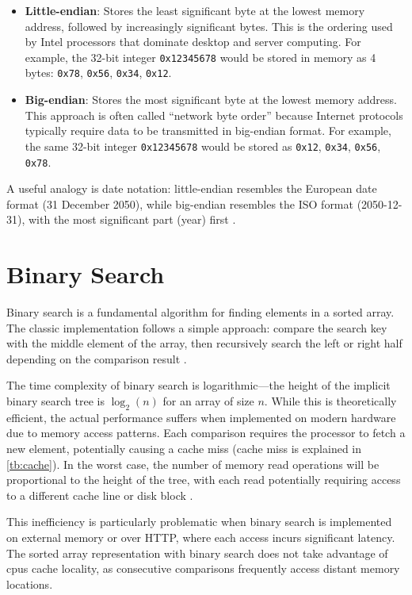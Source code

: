 \begin{itemize}
  \item \textbf{Little-endian}: Stores the least significant byte at the lowest memory address, followed by increasingly significant bytes. This is the ordering used by Intel processors that dominate desktop and server computing. For example, the 32-bit integer \texttt{0x12345678} would be stored in memory as 4 bytes: \texttt{0x78}, \texttt{0x56}, \texttt{0x34}, \texttt{0x12}.

  \item \textbf{Big-endian}: Stores the most significant byte at the lowest memory address. This approach is often called ``network byte order'' because Internet protocols typically require data to be transmitted in big-endian format. For example, the same 32-bit integer \texttt{0x12345678} would be stored as \texttt{0x12}, \texttt{0x34}, \texttt{0x56}, \texttt{0x78}.
\end{itemize}

A useful analogy is date notation: little-endian resembles the European date format (31 December 2050), while big-endian resembles the ISO format (2050-12-31), with the most significant part (year) first \citep{endianness_mdn}.

\section{Binary Search}
\label{tb:binary_search}

Binary search is a fundamental algorithm for finding elements in a sorted array. The classic implementation follows a simple approach: compare the search key with the middle element of the array, then recursively search the left or right half depending on the comparison result \citep{binary_search}.

The time complexity of binary search is logarithmic—the height of the implicit binary search tree is $\log_2(n)$ for an array of size $n$. While this is theoretically efficient, the actual performance suffers when implemented on modern hardware due to memory access patterns. Each comparison requires the processor to fetch a new element, potentially causing a cache miss (cache miss is explained in \autoref{tb:cache}). In the worst case, the number of memory read operations will be proportional to the height of the tree, with each read potentially requiring access to a different cache line or disk block \citep{binary_search}.

This inefficiency is particularly problematic when binary search is implemented on external memory or over HTTP, where each access incurs significant latency. The sorted array representation with binary search does not take advantage of \acp{cpu} cache locality, as consecutive comparisons frequently access distant memory locations.

